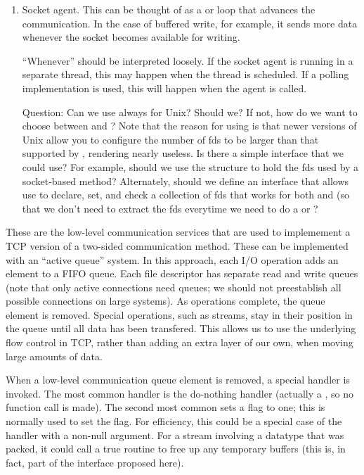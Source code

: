 \begin{enumerate}
\item Socket agent.  This can be thought of as a 
    or  loop that advances the communication.  In the case
    of buffered write, for example, it sends more data whenever the
    socket becomes available for writing.

    ``Whenever'' should be interpreted loosely.  If the socket
    agent is running in a separate thread, this may happen when the
    thread is scheduled.  If a polling implementation is used, this
    will happen when the agent is called.

    Question: Can we use  always for Unix?  Should we?  If not, how
    do we want to choose between  and ?
    Note that the reason for using  is that newer versions of Unix
    allow you to configure the number of fds to be larger than that supported
    by , rendering  nearly useless.  Is there a 
    simple interface that we could use?  For example, should we use the
     structure to hold the fds used by a socket-based
    method?  Alternately, should we define an interface that allows use to 
    declare, set, and check a collection of fds that works for both
     and  (so that we don't need to extract the fds
    everytime we need to do a  or ?

\end{enumerate}

These are the low-level communication services that are used to
implemement a TCP version of a two-sided communication method.
These can be implemented with an ``active queue'' system.  In this
approach, each I/O operation adds an element to a FIFO queue.  Each
file descriptor has separate read and write queues (note that only
active connections need queues; we should not preestablish all
possible connections on large systems).  As operations
complete, the queue element is removed.  Special operations, such as
streams, stay in their position in the queue until all data has been
transfered.  This allows us to use the underlying flow control in TCP,
rather than adding an extra layer of our own, when moving large
amounts of data.

When a low-level communication queue element is removed, a special handler is
invoked.  The 
most common handler is the do-nothing handler (actually a , so no
function call is made).  The second most common
sets a flag to one; this is normally used to set the
 flag.  For efficiency, this could be a
special case of the  handler with a non-null argument.
For a stream involving a datatype that was packed, it could call a true
routine to free up any temporary buffers (this is, in fact, part of the
interface proposed here).

